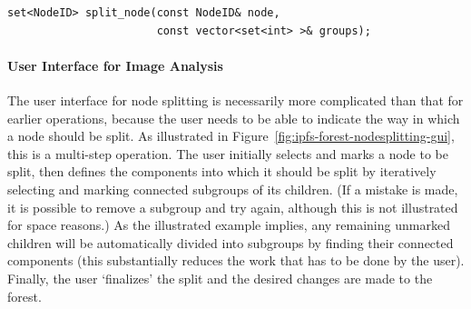 \begin{lstlisting}[style=Prototype]
set<NodeID> split_node(const NodeID& node,
                       const vector<set<int> >& groups);
\end{lstlisting}

\paragraph{User Interface for Image Analysis}

The user interface for node splitting is necessarily more complicated than that for earlier operations, because the user needs to be able to indicate the way in which a node should be split. As illustrated in Figure~\ref{fig:ipfs-forest-nodesplitting-gui}, this is a multi-step operation. The user initially selects and marks a node to be split, then defines the components into which it should be split by iteratively selecting and marking connected subgroups of its children. (If a mistake is made, it is possible to remove a subgroup and try again, although this is not illustrated for space reasons.) As the illustrated example implies, any remaining unmarked children will be automatically divided into subgroups by finding their connected components (this substantially reduces the work that has to be done by the user). Finally, the user `finalizes' the split and the desired changes are made to the forest.

